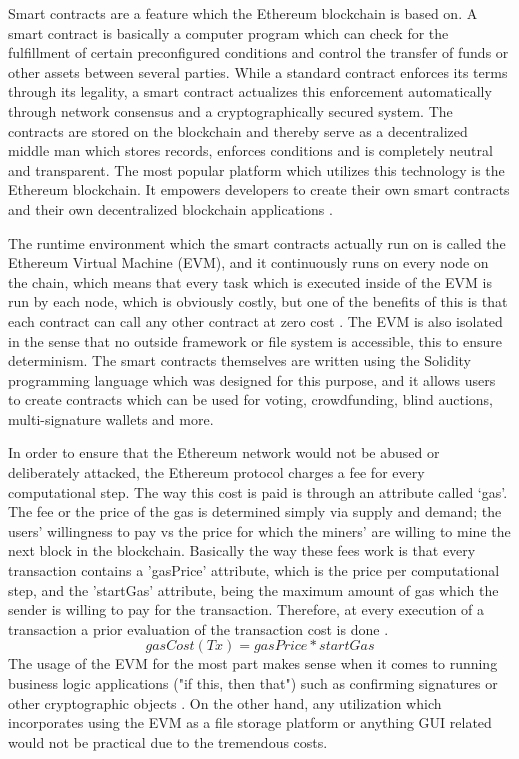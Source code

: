 Smart contracts are a feature which the Ethereum blockchain is based on. A smart contract is basically a computer program which can check for the fulfillment of certain preconfigured conditions and control the transfer of funds or other assets between several parties. While a standard contract enforces its terms through its legality, a smart contract actualizes this enforcement automatically through network consensus and a cryptographically secured system. The contracts are stored on the blockchain and thereby serve as a decentralized middle man which stores records, enforces conditions and is completely neutral and transparent. The most popular platform which utilizes this technology is the Ethereum blockchain. It empowers developers to create their own smart contracts and their own decentralized blockchain applications \cite{relatedWork38}.

The runtime environment which the smart contracts actually run on is called the Ethereum Virtual Machine (EVM), and it continuously runs on every node on the chain, which means that every task which is executed inside of the EVM is run by each node, which is obviously costly, but one of the benefits of this is that each contract can call any other contract at zero cost \cite{relatedWork38}. The EVM is also isolated in the sense that no outside framework or file system is accessible, this to ensure determinism. The smart contracts themselves are written using the Solidity programming language which was designed for this purpose, and it allows users to create contracts which can be used for voting, crowdfunding, blind auctions, multi-signature wallets and more.

In order to ensure that the Ethereum network would not be abused or deliberately attacked, the Ethereum protocol charges a fee for every computational step. The way this cost is paid is through an attribute called ‘gas’. The fee or the price of the gas is determined simply via supply and demand; the users’ willingness to pay vs the price for which the miners' are willing to mine the next block in the blockchain. Basically the way these fees work is that every transaction contains a 'gasPrice' attribute, which is the price per computational step, and the 'startGas' attribute, being the maximum amount of gas which the sender is willing to pay for the transaction. Therefore, at every execution of a transaction a prior evaluation of the transaction cost is done \cite{relatedWork38}.
				$$ gasCost(Tx)= {gasPrice * startGas}$$
The usage of the EVM for the most part makes sense when it comes to running business logic applications ("if this, then that") such as confirming signatures or other cryptographic objects \cite{relatedWork39}. On the other hand, any utilization which incorporates using the EVM as a file storage platform or anything GUI related would not be practical due to the tremendous costs.


